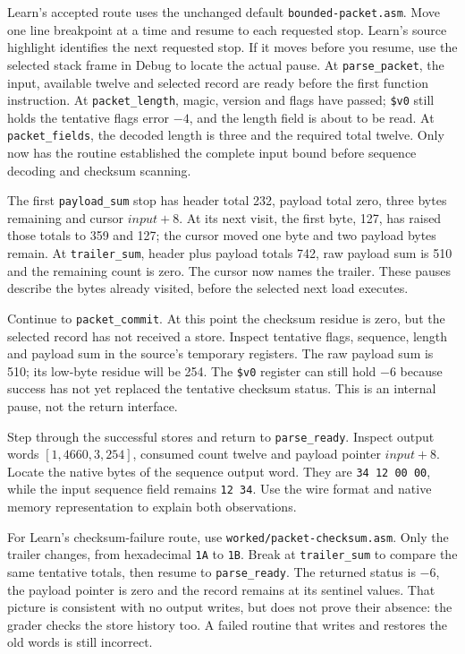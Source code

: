 Learn's accepted route uses the unchanged default \texttt{bounded-packet.asm}.
Move one line breakpoint at a time and resume to each requested stop. Learn's
source highlight identifies the next requested stop. If it moves before you
resume, use the selected stack frame in Debug to locate the actual pause. At
\texttt{parse\_packet}, the input, available twelve and selected record are
ready before the first function instruction. At \texttt{packet\_length}, magic,
version and flags have passed; \texttt{\$v0} still holds the tentative flags
error $-4$, and the length field is about to be read. At
\texttt{packet\_fields}, the decoded length is three and the required total
twelve. Only now has the routine established the complete input bound before
sequence decoding and checksum scanning.

The first \texttt{payload\_sum} stop has header total 232, payload total zero,
three bytes remaining and cursor $input+8$. At its next visit, the first byte,
127, has raised those totals to 359 and 127; the cursor moved one byte and two
payload bytes remain. At \texttt{trailer\_sum}, header plus payload totals
742, raw payload sum is 510 and the remaining count is zero. The cursor now
names the trailer. These pauses describe the bytes already visited, before
the selected next load executes.

Continue to \texttt{packet\_commit}. At this point
the checksum residue is zero, but the selected record has not received a store.
Inspect tentative flags, sequence, length and payload sum in the source's temporary
registers. The raw payload sum is 510; its low-byte residue will be 254. The
\texttt{\$v0} register can still hold $-6$ because success has not yet replaced
the tentative checksum status. This is an internal pause, not the return interface.

Step through the successful stores and return to \texttt{parse\_ready}. Inspect
output words $[1,4660,3,254]$, consumed count twelve and payload pointer $input+8$.
Locate the native bytes of the sequence output word. They are
\texttt{34 12 00 00}, while the input sequence field remains \texttt{12 34}.
Use the wire format and native memory representation to explain both observations.

For Learn's checksum-failure route, use \texttt{worked/packet-checksum.asm}.
Only the trailer changes, from hexadecimal \texttt{1A} to \texttt{1B}. Break at
\texttt{trailer\_sum} to compare the same tentative totals, then resume to
\texttt{parse\_ready}. The returned status is $-6$, the payload pointer is zero and the record remains
at its sentinel values. That picture is consistent with no output writes, but
does not prove their absence: the grader checks the store history too. A failed
routine that writes and restores the old words is still incorrect.

